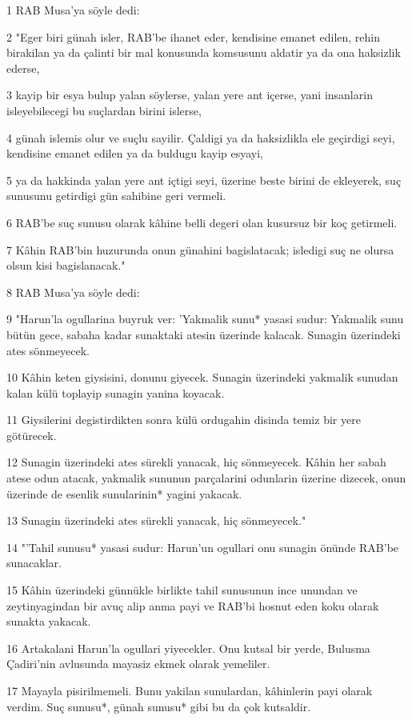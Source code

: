 \par 1 RAB Musa'ya söyle dedi:
\par 2 "Eger biri günah isler, RAB'be ihanet eder, kendisine emanet edilen, rehin birakilan ya da çalinti bir mal konusunda komsusunu aldatir ya da ona haksizlik ederse,
\par 3 kayip bir esya bulup yalan söylerse, yalan yere ant içerse, yani insanlarin isleyebilecegi bu suçlardan birini islerse,
\par 4 günah islemis olur ve suçlu sayilir. Çaldigi ya da haksizlikla ele geçirdigi seyi, kendisine emanet edilen ya da buldugu kayip esyayi,
\par 5 ya da hakkinda yalan yere ant içtigi seyi, üzerine beste birini de ekleyerek, suç sunusunu getirdigi gün sahibine geri vermeli.
\par 6 RAB'be suç sunusu olarak kâhine belli degeri olan kusursuz bir koç getirmeli.
\par 7 Kâhin RAB'bin huzurunda onun günahini bagislatacak; isledigi suç ne olursa olsun kisi bagislanacak."
\par 8 RAB Musa'ya söyle dedi:
\par 9 "Harun'la ogullarina buyruk ver: 'Yakmalik sunu* yasasi sudur: Yakmalik sunu bütün gece, sabaha kadar sunaktaki atesin üzerinde kalacak. Sunagin üzerindeki ates sönmeyecek.
\par 10 Kâhin keten giysisini, donunu giyecek. Sunagin üzerindeki yakmalik sunudan kalan külü toplayip sunagin yanina koyacak.
\par 11 Giysilerini degistirdikten sonra külü ordugahin disinda temiz bir yere götürecek.
\par 12 Sunagin üzerindeki ates sürekli yanacak, hiç sönmeyecek. Kâhin her sabah atese odun atacak, yakmalik sununun parçalarini odunlarin üzerine dizecek, onun üzerinde de esenlik sunularinin* yagini yakacak.
\par 13 Sunagin üzerindeki ates sürekli yanacak, hiç sönmeyecek."
\par 14 "'Tahil sunusu* yasasi sudur: Harun'un ogullari onu sunagin önünde RAB'be sunacaklar.
\par 15 Kâhin üzerindeki günnükle birlikte tahil sunusunun ince unundan ve zeytinyagindan bir avuç alip anma payi ve RAB'bi hosnut eden koku olarak sunakta yakacak.
\par 16 Artakalani Harun'la ogullari yiyecekler. Onu kutsal bir yerde, Bulusma Çadiri'nin avlusunda mayasiz ekmek olarak yemeliler.
\par 17 Mayayla pisirilmemeli. Bunu yakilan sunulardan, kâhinlerin payi olarak verdim. Suç sunusu*, günah sunusu* gibi bu da çok kutsaldir.
